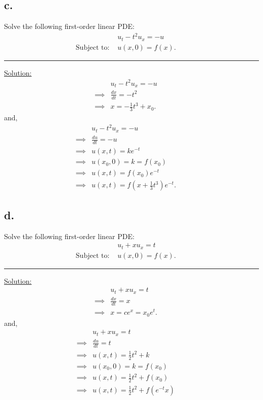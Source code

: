 \documentclass{article}
\begin{document}
\newpage

\subsection*{c.}
Solve the following first-order linear PDE:
\begin{align*}
  &u_t - t^2 u_x= -u &&\\
  \text{Subject to: }& u(x,0) = f(x).
\end{align*}

\begin{center}
  \noindent\rule{8cm}{0.4pt}
\end{center}

\underline{Solution:}
\begin{align*}
  &u_t - t^2 u_x= -u &&\\
  \implies& \frac{dx}{dt} = -t^2 &&\\
  \implies& x = - \frac{1}{3} t^3 + x_0.
\end{align*}
and,
\begin{align*}
  &u_t - t^2 u_x= -u &&\\
  \implies& \frac{du}{dt} = -u &&\\
  \implies& u(x,t) = ke^{-t} &&\\
  \implies& u(x_0,0) = k = f(x_0) &&\\
  \implies& u(x,t) = f(x_0)e^{-t} &&\\
  \implies& u(x,t) = f(x+\frac{1}{3}t^3)e^{-t}.
\end{align*}

\newpage

\subsection*{d.}
Solve the following first-order linear PDE:
\begin{align*}
  &u_t + x u_x= t &&\\
  \text{Subject to: }& u(x,0) = f(x).
\end{align*}

\begin{center}
  \noindent\rule{8cm}{0.4pt}
\end{center}

\underline{Solution:}
\begin{align*}
  &u_t + x u_x= t &&\\
  \implies& \frac{dx}{dt} = x &&\\
  \implies& x = ce^x = x_0e^t.
\end{align*}
and,
\begin{align*}
  &u_t + x u_x= t &&\\
  \implies& \frac{du}{dt} = t &&\\
  \implies& u(x,t) = \frac{1}{2} t^2 + k &&\\
  \implies& u(x_0,0) = k = f(x_0) &&\\
  \implies& u(x,t) = \frac{1}{2} t^2 + f(x_0) &&\\
  \implies& u(x,t) = \frac{1}{2} t^2 + f(e^{-t}x) &&\\
\end{align*}
\end{document}
